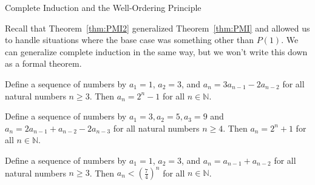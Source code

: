 \begin{section}{Complete Induction and the Well-Ordering Principle}
\begin{skeleton}
\begin{center}
\end{center}
\end{skeleton}

Recall that Theorem~\ref{thm:PMI2} generalized Theorem~\ref{thm:PMI} and allowed us to handle situations where the base case was something other than $P(1)$.  We can generalize complete induction in the same way, but we won't write this down as a formal theorem.

\begin{theorem}
Define a sequence of numbers by $a_1 = 1$, $a_2 = 3$, and $a_n = 3a_{n-1} - 2a_{n-2}$ for all natural numbers $n \geq 3$.  Then $a_n = 2^n - 1$ for all $n \in \mathbb{N}$.  
\end{theorem}

\begin{theorem}
Define a sequence of numbers by $a_1 = 3, a_2 = 5, a_3 = 9$ and $a_n = 2a_{n-1} + a_{n-2}-2a_{n-3}$ for all natural numbers $n \geq 4$.  Then $a_n = 2^n + 1$ for all $n \in \mathbb{N}$.  
\end{theorem}

\begin{theorem}
Define a sequence of numbers by $a_1=1$, $a_2=3$, and $a_n=a_{n-1}+a_{n-2}$ for all natural numbers $n \geq 3$.  Then $a_n < \left( \frac{7}{4} \right)^n$ for all $n \in \mathbb{N}$.
\end{theorem}


\end{section}
